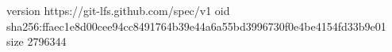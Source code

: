 version https://git-lfs.github.com/spec/v1
oid sha256:ffaec1e8d00cee94cc8491764b39e44a6a55bd3996730f0e4be4154fd33b9e01
size 2796344
